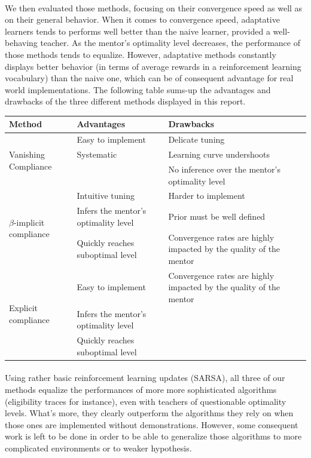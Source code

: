 \documentclass[a4paper]{report}
\begin{document}
{{{			\paragraph{} We then evaluated those methods, focusing on their convergence speed as well as on their general behavior. When it comes to convergence speed, adaptative learners tends to performs well better than the naive learner, provided a well-behaving teacher. As the mentor's optimality level decreases, the performance of those methods tends to equalize. 
			\newline However, adaptative methods constantly displays better behavior (in terms of average rewards in a reinforcement learning vocabulary) than the naive one, which can be of consequent advantage for real world implementations. The following table sums-up the advantages and drawbacks of the three different methods displayed in this report. 
			
			\begin{center}
				\begin{tabularx}{\textwidth}{|X|X|X|}
					\hline
					\textbf{Method} & \textbf{Advantages} & \textbf{Drawbacks}\\
					\hline
					\multirow{3}{*}{Vanishing Compliance} & Easy to implement & Delicate tuning\\
												   & Systematic & Learning curve undershoots \\
												   & & No inference over the mentor's optimality level \\
					\hline
					\multirow{3}{*}{$\beta$-implicit compliance} &  Intuitive tuning & Harder to implement \\
													  & Infers the mentor's optimality level & Prior must be well defined \\
													  & Quickly reaches suboptimal level & Convergence rates are highly impacted by the quality of the mentor \\ 
					\hline
					\multirow{3}{*}{Explicit compliance} &  Easy to implement &  Convergence rates are highly impacted by the quality of the mentor \\
					& Infers the mentor's optimality level  & \\
					& Quickly reaches suboptimal level  & \\
					\hline
				\end{tabularx}
			\end{center}
			
			\paragraph{} Using rather basic reinforcement learning updates (SARSA), all three of our methods equalize the performances of more more sophisticated algorithms (eligibility traces for instance), even with teachers of questionable optimality levels. What's more, they clearly outperform the algorithms they rely on when those ones are implemented without demonstrations. However, some consequent work is left to be done in order to be able to generalize those algorithms to more complicated environments or to weaker hypothesis. 
		}
}}
\end{document}
